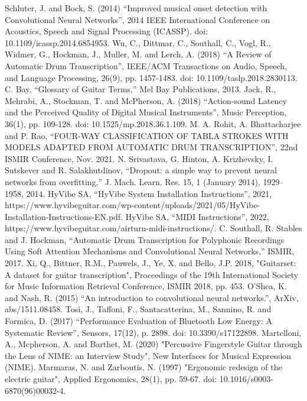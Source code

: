 \documentclass[conference]{IEEEtran}
\begin{document}
\begin{thebibliography}{00}
 Schluter, J. and Bock, S. (2014) ``Improved musical onset detection with Convolutional Neural Networks'', 2014 IEEE International Conference on Acoustics, Speech and Signal Processing (ICASSP). doi: 10.1109/icassp.2014.6854953.
 Wu, C., Dittmar, C., Southall, C., Vogl, R., Widmer, G., Hockman, J., Muller, M. and Lerch, A. (2018) ``A Review of Automatic Drum Transcription'', IEEE/ACM Transactions on Audio, Speech, and Language Processing, 26(9), pp. 1457-1483. doi: 10.1109/taslp.2018.2830113.
 C. Bay, ``Glossary of Guitar Terms,'' Mel Bay Publications, 2013.
 Jack, R., Mehrabi, A., Stockman, T. and McPherson, A. (2018) ``Action-sound Latency and the Perceived Quality of Digital Musical Instruments'', Music Perception, 36(1), pp. 109-128. doi: 10.1525/mp.2018.36.1.109.
 M. A. Rohit, A. Bhattacharjee and P. Rao, ``FOUR-WAY CLASSIFICATION OF TABLA STROKES WITH MODELS ADAPTED FROM AUTOMATIC DRUM TRANSCRIPTION'', 22nd ISMIR Conference, Nov. 2021.
 N. Srivastava, G. Hinton, A. Krizhevsky, I. Sutskever and R. Salakhutdinov, ``Dropout: a simple way to prevent neural networks from overfitting,'' J. Mach. Learn. Res. 15, 1 (January 2014), 1929–1958, 2014.
 HyVibe SA, ``HyVibe System Installation Instructions'', 2021, https://www.hyvibeguitar.com/wp-content/uploads/2021/05/HyVibe-Installation-Instructions-EN.pdf.
 HyVibe SA, ``MIDI Instructions'', 2022, https://www.hyvibeguitar.com/airturn-midi-instructions/.
 C. Southall, R. Stables and J. Hockman, ``Automatic Drum Transcription for Polyphonic Recordings Using Soft Attention Mechanisms and Convolutional Neural Networks,'' ISMIR, 2017.
 Xi, Q., Bittner, R.M., Pauwels, J., Ye, X. and Bello, J.P. 2018, "Guitarset: A dataset for guitar transcription", Proceedings of the 19th International Society for Music Information Retrieval Conference, ISMIR 2018, pp. 453.
 O'Shea, K. and Nash, R. (2015) ``An introduction to convolutional neural networks.'', ArXiv, abs/1511.08458.
 Tosi, J., Taffoni, F., Santacatterina, M., Sannino, R. and Formica, D. (2017) ``Performance Evaluation of Bluetooth Low Energy: A Systematic Review'', Sensors, 17(12), p. 2898. doi: 10.3390/s17122898.
 Martelloni, A., Mcpherson, A. and Barthet, M. (2020) "Percussive Fingerstyle Guitar through the Lens of NIME: an Interview Study", New Interfaces for Musical Expression (NIME).
 Marmaras, N. and Zarboutis, N. (1997) "Ergonomic redesign of the electric guitar", Applied Ergonomics, 28(1), pp. 59-67. doi: 10.1016/s0003-6870(96)00032-4.

\end{thebibliography}
\vspace{12pt}
\end{document}
